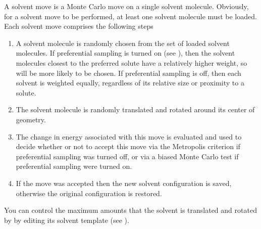 \documentclass[letterpaper,10pt,english]{sphinxmanual}
\begin{document}
\ignorespaces 
{}

A solvent move is a Monte Carlo move on a single solvent molecule. Obviously, for a solvent move to be performed, at least one solvent molecule must be loaded. Each solvent move comprises the following steps
\begin{enumerate}
\item {} 
A solvent molecule is randomly chosen from the set of loaded solvent molecules. If preferential sampling is turned on (see {\hyperref[\detokenize{protoms:parameters}]{}}), then the solvent molecules closest to the preferred solute have a relatively higher weight, so will be more likely to be chosen. If preferential sampling is off, then each solvent is weighted equally, regardless of its relative size or proximity to a solute.

\item {} 
The solvent molecule is randomly translated and rotated around its center of geometry.

\item {} 
The change in energy associated with this move is evaluated and used to decide whether or not to accept this move via the Metropolis criterion if preferential sampling was turned off, or via a biased Monte Carlo test if preferential sampling were turned on.

\item {} 
If the move was accepted then the new solvent configuration is saved, otherwise the original configuration is restored.

\end{enumerate}

You can control the maximum amounts that the solvent is translated and rotated by by editing its solvent template (see {\hyperref[\detokenize{protoms:temref}]{}}).

\ignorespaces 
{}
\end{document}
